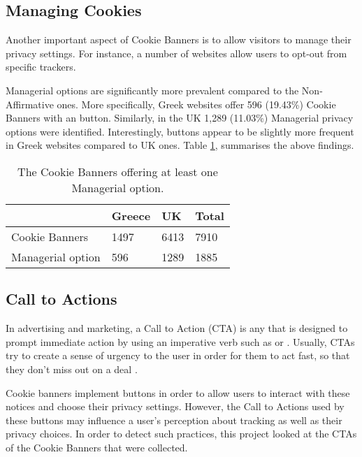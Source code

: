 \documentclass[../main.tex]{subfiles}
\begin{document}
\subsection{Managing Cookies}
Another important aspect of Cookie Banners is to allow visitors to manage their privacy settings. For instance, a number of websites allow users to opt-out from specific trackers. 

Managerial options are significantly more prevalent compared to the Non-Affirmative ones. More specifically, Greek websites offer 596 (19.43\%) Cookie Banners with an  button. Similarly, in the UK 1,289 (11.03\%) Managerial privacy options were identified. Interestingly,  buttons appear to be slightly more frequent in Greek websites compared to UK ones. Table \ref{tab:Managerial_options}, summarises the above findings.

\begin{table}[ht]
    \centering
    \begin{tabular}{@{}llll@{}}
        \toprule
                        & Greece & UK   & Total \\ \midrule
        Cookie Banners    & 1497   & 6413 & 7910  \\
        Managerial option & 596    & 1289 & 1885  \\ \bottomrule
    \end{tabular}
    \caption{The Cookie Banners offering at least one Managerial option.}
    \label{tab:Managerial_options}
\end{table}

\subsection{Call to Actions}
In advertising and marketing, a Call to Action (CTA) is any  that is designed to prompt immediate action by using an imperative verb such as  or  \cite{eisenberg2006call}. Usually, CTAs try to create a sense of urgency to the user in order for them to act fast, so that they don’t miss out on a deal \cite{hornor_2012}.

Cookie banners implement buttons in order to allow users to interact with these notices and choose their privacy settings. However, the Call to Actions used by these buttons may influence a user’s perception about tracking as well as their privacy choices. In order to detect such practices, this project looked at the CTAs of the Cookie Banners that were collected.
\end{document}
